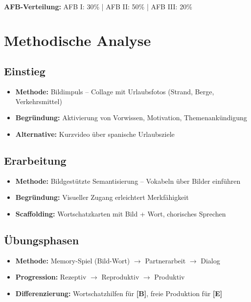 \documentclass[11pt,a4paper]{article}
\newcommand{\B}{\textcolor{basis}{\textbf{[B]}}}
\newcommand{\E}{\textcolor{erweiterung}{\textbf{[E]}}}
\begin{document}
\vspace{1em}
\textbf{AFB-Verteilung:} AFB I: 30\% | AFB II: 50\% | AFB III: 20\%

\section{Methodische Analyse}

\subsection{Einstieg}
\begin{itemize}
    \item \textbf{Methode:} Bildimpuls -- Collage mit Urlaubsfotos (Strand, Berge, Verkehrsmittel)
    \item \textbf{Begründung:} Aktivierung von Vorwissen, Motivation, Themenankündigung
    \item \textbf{Alternative:} Kurzvideo über spanische Urlaubsziele
\end{itemize}

\subsection{Erarbeitung}
\begin{itemize}
    \item \textbf{Methode:} Bildgestützte Semantisierung -- Vokabeln über Bilder einführen
    \item \textbf{Begründung:} Visueller Zugang erleichtert Merkfähigkeit
    \item \textbf{Scaffolding:} Wortschatzkarten mit Bild + Wort, chorisches Sprechen
\end{itemize}

\subsection{Übungsphasen}
\begin{itemize}
    \item \textbf{Methode:} Memory-Spiel (Bild-Wort) $\rightarrow$ Partnerarbeit $\rightarrow$ Dialog
    \item \textbf{Progression:} Rezeptiv $\rightarrow$ Reproduktiv $\rightarrow$ Produktiv
    \item \textbf{Differenzierung:} Wortschatzhilfen für \B{}, freie Produktion für \E{}
\end{itemize}
\end{document}
